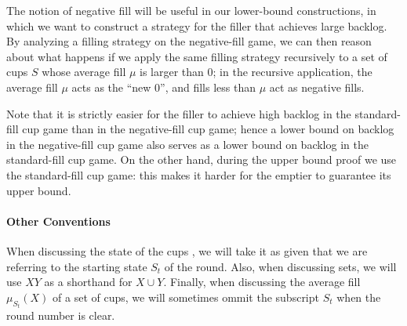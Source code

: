 The notion of negative fill will be useful in our lower-bound
constructions, in which we want to construct a strategy for the filler
that achieves large backlog. By analyzing a filling strategy on the
negative-fill game, we can then reason about what happens if we apply
the same filling strategy recursively to a set of cups $S$ whose
average fill $\mu$ is larger than $0$; in the recursive application,
the average fill $\mu$ acts as the ``new $0$'', and fills less than
$\mu$ act as negative fills.

Note that it is strictly easier for the filler to achieve high backlog
in the standard-fill cup game than in the negative-fill cup game;
hence a lower bound on backlog in the negative-fill cup game also
serves as a lower bound on backlog in the standard-fill cup game.  On
the other hand, during the upper bound proof we use the standard-fill
cup game: this makes it harder for the emptier to guarantee its upper
bound.

\paragraph{Other Conventions} When discussing the state of the cups
, we will take it as given that we are
referring to the starting state $S_t$ of the round. Also, when
discussing sets, we will use $XY$ as a shorthand for $X \cup
Y$. Finally, when discussing the average fill $\mu_{S_t}(X)$ of a set
of cups, we will sometimes ommit the subscript $S_t$ when the round
number is clear.
